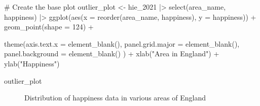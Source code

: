 \documentclass[
  letterpaper,
]{krantz}
\makeatletter
\newenvironment{Shaded}{\begin{snugshade}}{\end{snugshade}}
\newcommand{\AttributeTok}[1]{\textcolor[rgb]{0.40,0.45,0.13}{#1}}
\newcommand{\CommentTok}[1]{\textcolor[rgb]{0.37,0.37,0.37}{#1}}
\newcommand{\DecValTok}[1]{\textcolor[rgb]{0.68,0.00,0.00}{#1}}
\newcommand{\FunctionTok}[1]{\textcolor[rgb]{0.28,0.35,0.67}{#1}}
\newcommand{\NormalTok}[1]{\textcolor[rgb]{0.00,0.23,0.31}{#1}}
\newcommand{\OtherTok}[1]{\textcolor[rgb]{0.00,0.23,0.31}{#1}}
\newcommand{\SpecialCharTok}[1]{\textcolor[rgb]{0.37,0.37,0.37}{#1}}
\newcommand{\StringTok}[1]{\textcolor[rgb]{0.13,0.47,0.30}{#1}}
\newenvironment{kframe}{%
\medskip{}
\setlength{\fboxsep}{.8em}
 \def\at@end@of@kframe{}%
 \ifinner\ifhmode%
  \def\at@end@of@kframe{\end{minipage}}%
  \begin{minipage}{\columnwidth}%
 \fi\fi%
 \def\FrameCommand##1{\hskip\@totalleftmargin \hskip-\fboxsep
 \colorbox{shadecolor}{##1}\hskip-\fboxsep
     \hskip-\linewidth \hskip-\@totalleftmargin \hskip\columnwidth}%
 \MakeFramed {\advance\hsize-\width
   \@totalleftmargin\z@ \linewidth\hsize
   \@setminipage}}%
 {\par\unskip\endMakeFramed%
 \at@end@of@kframe}
\renewenvironment{Shaded}{\begin{kframe}}{\end{kframe}}
\makeatother
\begin{document}
\begin{Shaded}
\begin{Highlighting}[]
\CommentTok{\# Create the base plot}
\NormalTok{outlier\_plot }\OtherTok{\textless{}{-}}
\NormalTok{  hie\_2021 }\SpecialCharTok{|\textgreater{}}
  \FunctionTok{select}\NormalTok{(area\_name, happiness) }\SpecialCharTok{|\textgreater{}}
  \FunctionTok{ggplot}\NormalTok{(}\FunctionTok{aes}\NormalTok{(}\AttributeTok{x =} \FunctionTok{reorder}\NormalTok{(area\_name, happiness),}
             \AttributeTok{y =}\NormalTok{ happiness)) }\SpecialCharTok{+}
  \FunctionTok{geom\_point}\NormalTok{(}\AttributeTok{shape =} \DecValTok{124}\NormalTok{) }\SpecialCharTok{+}
  
  \FunctionTok{theme}\NormalTok{(}\AttributeTok{axis.text.x =} \FunctionTok{element\_blank}\NormalTok{(),}
        \AttributeTok{panel.grid.major =} \FunctionTok{element\_blank}\NormalTok{(),}
        \AttributeTok{panel.background =} \FunctionTok{element\_blank}\NormalTok{()}
\NormalTok{  ) }\SpecialCharTok{+}
  \FunctionTok{xlab}\NormalTok{(}\StringTok{"Area in England"}\NormalTok{) }\SpecialCharTok{+}
  \FunctionTok{ylab}\NormalTok{(}\StringTok{"Happiness"}\NormalTok{)}

\NormalTok{outlier\_plot}
\end{Highlighting}
\end{Shaded}

\begin{figure}


\caption{\label{fig-deviation-plot-happiness}Distribution of happiness
data in various areas of England}

\end{figure}%
\end{document}
